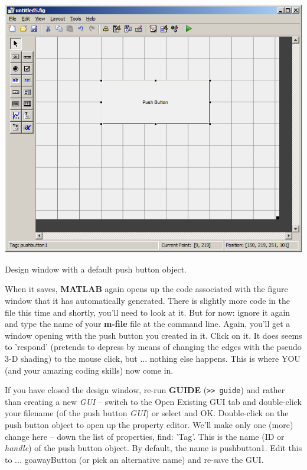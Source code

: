 \documentclass{tufte-book} %
\begin{document}
\begin{marginfigure}[0.0in]
\includegraphics[width=\linewidth]{chGUI-PushButton.png}
\caption{Design window with a default push button object.}
\label{fig:chGUI-PushButton}
\end{marginfigure}

When it saves, \textbf{MATLAB} again opens up the code associated with the figure window that it has automatically generated. There is slightly more code in the file this time and shortly, you'll need to look at it. But for now: ignore it again and type the name of your \textbf{m-file} file at the command line. Again, you'll get a window opening with the push button you created in it. Click on it. It does seems to 'respond' (pretends to depress by means of changing the edges with the pseudo 3-D shading) to the mouse click, but ... nothing else happens. This is where YOU (and your amazing coding skills) now come in.

If you have closed the design window, re-run \textbf{GUIDE} (\texttt{\textgreater\textgreater\ guide}) and rather than creating a new \textit{GUI} -- switch to the \textsf{Open Existing GUI} tab and double-click your filename (of the push button \textit{GUI}) or select and OK. Double-click on the push button object to open up the property editor. We'll make only one (more) change here -- down the list of properties, find: '\textsf{Tag}'. This is the name (ID or \textit{handle}) of the push button object. By default, the name is \textsf{pushbutton1}. Edit this to ... \textsf{goawayButton} (or pick an alternative name) and re-save the GUI.
\end{document}

